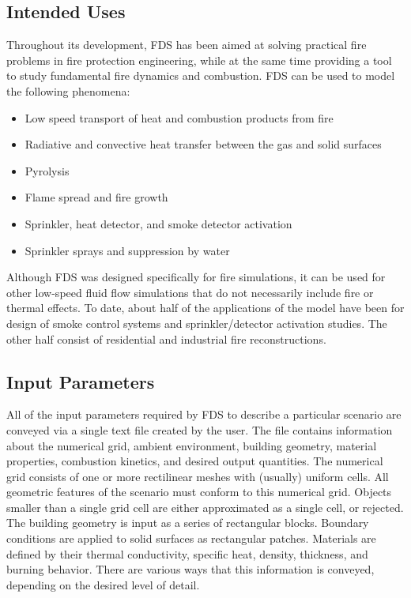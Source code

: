 \documentclass[11pt]{book}
\begin{document}
\subsection{Intended Uses}

Throughout its development, FDS has been aimed at solving practical
fire problems in fire protection engineering, while at the same time
providing a tool to study fundamental fire dynamics and combustion.
FDS can be used to model the following phenomena:
\begin{itemize}
\setlength{\itemsep}{0.0in}
\item Low speed transport of heat and combustion products from fire
\item Radiative and convective heat transfer between the gas and solid surfaces
\item Pyrolysis
\item Flame spread and fire growth
\item Sprinkler, heat detector, and smoke detector activation
\item Sprinkler sprays and suppression by water
\end{itemize}
Although FDS was designed specifically for fire simulations,
it can be used for other low-speed fluid flow simulations that do not necessarily
include fire or thermal effects. To date, about half of the
applications of the model have been for design of smoke control
systems and sprinkler/detector activation studies.
The other half consist of residential and industrial fire reconstructions.


\subsection{Input Parameters}

All of the input parameters required by FDS to describe a particular
scenario are conveyed via a single text file created by the user.
The file contains information about the numerical grid, ambient environment, building geometry, material
properties, combustion kinetics, and desired output quantities.
The numerical grid consists of one or more rectilinear meshes with (usually) uniform cells. All geometric features of the
scenario must conform to this numerical grid. Objects smaller than a single grid cell are either approximated
as a single cell, or rejected. The building geometry is input as a series of rectangular blocks. Boundary conditions are
applied to solid surfaces as rectangular patches. Materials are defined by their thermal conductivity, specific heat,
density, thickness, and burning behavior. There are various ways that this information is conveyed, depending on the
desired level of detail.
\end{document}
